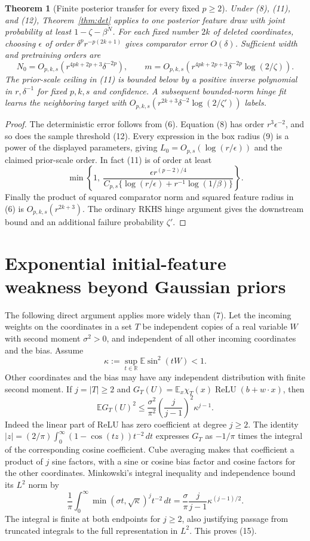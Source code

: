 \documentclass[11pt]{article}
\newtheorem{theorem}{Theorem}\newtheorem{lemma}[theorem]{Lemma}
\newcommand{\E}{\mathbb E}\newcommand{\R}{\mathbb R}
\newcommand{\relu}{\operatorname{ReLU}}
\begin{document}
\begin{theorem}[Finite posterior transfer for every fixed $p\ge2$]
Under (8), (11), and (12), Theorem~\ref{thm:det} applies to one
posterior feature draw with joint probability at least
$1-\zeta-\beta^N$. For each fixed number $2k$ of deleted coordinates,
choosing $\epsilon$ of order
$\delta^p r^{-p(2k+1)}$ gives comparator error $O(\delta)$.
Sufficient width and pretraining orders are
\[
 N_0=O_{p,k,s}(r^{4pk+2p+3}\delta^{-2p}),\qquad
 m=O_{p,k,s}(r^{4pk+2p+3}\delta^{-2p}\log(2/\zeta)).     \tag{13}
\]
The prior-scale ceiling in (11) is bounded below by a positive
inverse polynomial in $r,\delta^{-1}$ for fixed $p,k,s$ and confidence.
A subsequent bounded-norm hinge fit learns the neighboring target
with $O_{p,k,s}(r^{2k+3}\delta^{-2}\log(2/\zeta'))$ labels.
\end{theorem}
\begin{proof}
The deterministic error follows from (6). Equation (8) has order
$r^3\epsilon^{-2}$, and so does the sample threshold (12).
Every expression in the box radius (9) is a power of the displayed
parameters, giving $L_0=O_{p,s}(\log(r/\epsilon))$ and the claimed
prior-scale order. In fact (11) is of order at least
\[
 \min\left\{1,\
 \frac{\epsilon r^{(p-2)/4}}
 {C_{p,s}\{\log(r/\epsilon)+r^{-1}\log(1/\beta)\}}\right\}.
\]
Finally the product of squared comparator norm and squared feature
radius in (6) is $O_{p,k,s}(r^{2k+3})$. The ordinary RKHS hinge
argument gives the downstream bound and an additional failure
probability $\zeta'$.
\end{proof}



\section{Exponential initial-feature weakness beyond Gaussian priors}
The following direct argument applies more widely than (7).
Let the incoming weights on the coordinates in a set $T$ be independent
copies of a real variable $W$ with second moment $\sigma^2>0$, and
independent of all other incoming coordinates and the bias. Assume
\[
              \kappa:=\sup_{t\in\R}\E\sin^2(tW)<1.
 \tag{14}
\]
Other coordinates and the bias may have any independent distribution
with finite second moment. If $j=|T|\ge2$ and
$G_T(U)=\E_x\chi_T(x)\relu(b+w\cdot x)$, then
\[
 \E G_T(U)^2\le
       \frac{\sigma^2}{\pi^2}\left(\frac j{j-1}\right)^2
                                    \kappa^{j-1}.      \tag{15}
\]
Indeed the linear part of ReLU has zero coefficient at degree $j\ge2$.
The identity $|z|=(2/\pi)\int_0^\infty(1-\cos(tz))t^{-2}\,dt$
expresses $G_T$ as $-1/\pi$ times the integral of the corresponding
cosine coefficient. Cube averaging makes that coefficient a product
of $j$ sine factors, with a sine or cosine bias factor and cosine
factors for the other coordinates. Minkowski's integral inequality
and independence bound its $L^2$ norm by
\[
 \frac1\pi\int_0^\infty
          \min(\sigma t,\sqrt\kappa)^j t^{-2}\,dt
       =\frac\sigma\pi\frac j{j-1}\kappa^{(j-1)/2}.
\]
The integral is finite at both endpoints for $j\ge2$, also justifying
passage from truncated integrals to the full representation in $L^2$.
This proves (15).
\end{document}
